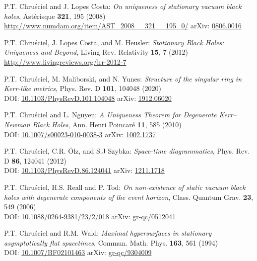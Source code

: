 \begin{thebibliography}{123}
P.T. Chru\'sciel and J. Lopes Costa:
{\em On uniqueness of stationary vacuum black holes},
Astérisque {\bf 321}, 195 (2008)\\
\url{http://www.numdam.org/item/AST_2008__321__195_0/}\hfill
arXiv: \href{https://arxiv.org/abs/0806.0016}{0806.0016}

P.T. Chru\'sciel, J. Lopes Costa, and M. Heusler:
{\em Stationary Black Holes: Uniqueness and Beyond},
Living Rev. Relativity {\bf 15}, 7 (2012) \\
\url{http://www.livingreviews.org/lrr-2012-7}

P.T. Chru\'sciel, M. Maliborski, and N. Yunes:
{\em Structure of the singular ring in Kerr-like metrics},
Phys. Rev. D {\bf 101}, 104048 (2020)\\
DOI: \href{https://doi.org/10.1103/PhysRevD.101.104048}{10.1103/PhysRevD.101.104048}\hfill
arXiv: \href{https://arxiv.org/abs/1912.06020}{1912.06020}

P.T. Chru\'sciel and L. Nguyen:
{\em A Uniqueness Theorem for Degenerate Kerr–Newman Black Holes},
Ann. Henri Poincar\'e {\bf 11}, 585 (2010)\\
DOI: \href{https://doi.org/10.1007/s00023-010-0038-3}{10.1007/s00023-010-0038-3}\hfill
arXiv: \href{https://arxiv.org/abs/1002.1737}{1002.1737}

P.T. Chru\'sciel, C.R. Ölz, and S.J Szybka:
{\em Space-time diagrammatics},
Phys. Rev. D {\bf 86}, 124041 (2012)\\
DOI:  \href{https://doi.org/10.1103/PhysRevD.86.124041}{10.1103/PhysRevD.86.124041}\hfill
arXiv: \href{https://arxiv.org/abs/1211.1718}{1211.1718}

P.T. Chru\'sciel, H.S. Reall and P. Tod:
{\em On non-existence of static vacuum black holes with degenerate components of the event horizon},
Class. Quantum Grav. {\bf 23}, 549 (2006)\\
DOI: \href{https://doi.org/10.1088/0264-9381/23/2/018}{10.1088/0264-9381/23/2/018}\hfill
arXiv: \href{https://arxiv.org/abs/gr-qc/0512041}{gr-qc/0512041}

P.T. Chru\'sciel and R.M. Wald:
{\em Maximal hypersurfaces in stationary asymptotically flat spacetimes},
Commun. Math. Phys. {\bf 163}, 561 (1994)\\
DOI: \href{https://doi.org/10.1007/BF02101463}{10.1007/BF02101463}\hfill
arXiv: \href{https://arxiv.org/abs/gr-qc/9304009}{gr-qc/9304009}


\end{thebibliography}
